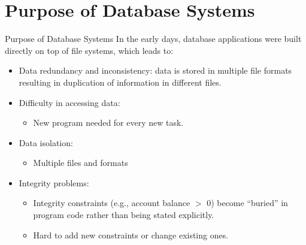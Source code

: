 \documentclass{beamer}
\begin{document}
\section{Purpose of Database Systems}

\begin{frame}{Purpose of Database Systems}
    In the early days, database applications were built directly on top of file systems, which leads to:
    \begin{itemize}
        \item Data redundancy and inconsistency: data is stored  in multiple file formats resulting in duplication of information in different files.
        \item Difficulty in accessing data:
        \begin{itemize}
            \item New program needed for every new task.
        \end{itemize}
        \item Data isolation:
        \begin{itemize}
            \item Multiple files and formats
        \end{itemize}
        \item Integrity problems:
        \begin{itemize}
            \item Integrity constraints  (e.g., account balance $>$ 0) become ``buried'' in program code rather than being stated explicitly.
            \item Hard to add new constraints or change existing ones.
        \end{itemize}
    \end{itemize}
\end{frame}
\end{document}
